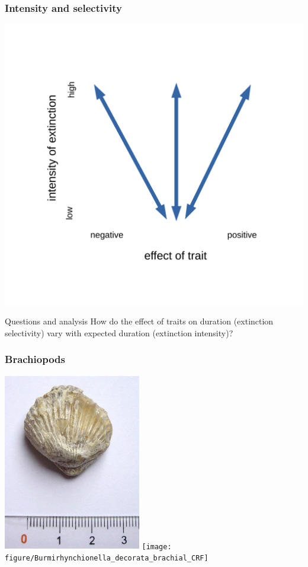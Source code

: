 \documentclass{beamer}
\begin{document}
\begin{frame}
  \frametitle{Intensity and selectivity}
  \begin{center}
    \includegraphics[width = \textwidth,height = 0.8\textheight,keepaspectratio = true]{figure/intensity_selectivity_base}
  \end{center}
\end{frame}

\begin{frame}
  \begin{alertblock}{Questions and analysis}
    How do the effect of traits on duration (\alert{extinction selectivity}) vary with expected duration (\alert{extinction intensity})?
  \end{alertblock}
\end{frame}

\begin{frame}
  \frametitle{Brachiopods}
  \includegraphics[width = 0.45\textwidth,height = 0.8\textheight,keepaspectratio = true]{figure/Brachiopod_fossil}
  \texttt{[image: figure/Burmirhynchionella\_decorata\_brachial\_CRF]}

  \tiny{}
\end{frame}
\end{document}
